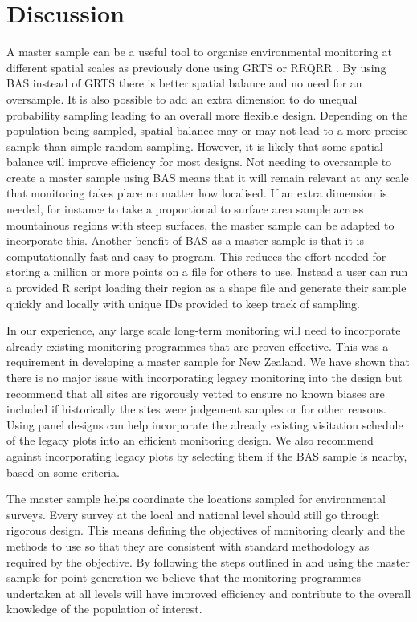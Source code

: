 \documentclass[titlepage]{article}
\begin{document}
\section{Discussion}
A master sample can be a useful tool to organise environmental monitoring at different spatial scales as previously done using GRTS or RRQRR \citep{LarsenOlsenStevens2008, theobald2016}. By using BAS instead of GRTS there is better spatial balance \citep{Robertson2013} and no need for an oversample. It is also possible to add an extra dimension to do unequal probability sampling leading to an overall more flexible design. Depending on the population being sampled, spatial balance may or may not lead to a more precise sample than simple random sampling. However, it is likely that some spatial balance will improve efficiency for most designs. Not needing to oversample to create a master sample using BAS means that it will remain relevant at any scale that monitoring takes place no matter how localised. If an extra dimension is needed, for instance to take a proportional to surface area sample across mountainous regions with steep surfaces, the master sample can be adapted to incorporate this. Another benefit of BAS as a master sample is that it is computationally fast and easy to program. This reduces the effort needed for storing a million or more points on a file for others to use. Instead a user can run a provided R script loading their region as a shape file and generate their sample quickly and locally with unique IDs provided to keep track of sampling.

In our experience, any large scale long-term monitoring will need to incorporate already existing monitoring programmes that are proven effective. This was a requirement in developing a master sample for New Zealand. We have shown that there is no major issue with incorporating legacy monitoring into the design but recommend that all sites are rigorously vetted to ensure no known biases are included if historically the sites were judgement samples or for other reasons. Using panel designs can help incorporate the already existing visitation schedule of the legacy plots into an efficient monitoring design. We also recommend against incorporating legacy plots by selecting them if the BAS sample is nearby, based on some criteria.

The master sample helps coordinate the locations sampled for environmental surveys. Every survey at the local and national level should still go through rigorous design. This means defining the objectives of monitoring clearly and the methods to use so that they are consistent with standard methodology as required by the objective. By following the steps outlined in \cite{Reynolds2016} and using the master sample for point generation we believe that the monitoring programmes undertaken at all levels will have improved efficiency and contribute to the overall knowledge of the population of interest.
\end{document}
